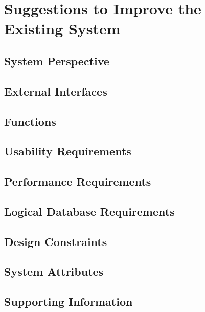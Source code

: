 \section{Suggestions to Improve the Existing System}

\subsection{System Perspective}

\subsection{External Interfaces}

\subsection{Functions}

\subsection{Usability Requirements}

\subsection{Performance Requirements}

\subsection{Logical Database Requirements}

\subsection{Design Constraints}

\subsection{System Attributes}

\subsection{Supporting Information}
